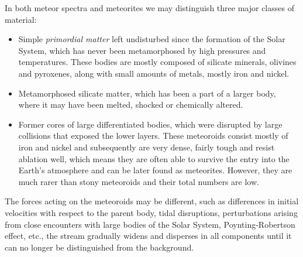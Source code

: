             In both meteor spectra and meteorites we may distinguish three major classes of material:
            \begin{itemize}
                \item Simple \emph{primordial matter} left undisturbed since the formation of the Solar System,
                    which has never been metamorphosed by high pressures and temperatures.
                    These bodies are mostly composed of silicate minerals, olivines and pyroxenes,
                    along with small amounts of metals, mostly iron and nickel.
                \item Metamorphosed silicate matter, which has been a part of a larger body,
                    where it may have been melted, shocked or chemically altered.
                \item Former cores of large differentiated bodies, which were disrupted by large collisions
                    that exposed the lower layers.
                    These meteoroids consist mostly of iron and nickel and subsequently are very dense,
                    fairly tough and resist ablation well, which means they are often able to
                    survive the entry into the Earth's atmosphere and can be later found as meteorites.
                    However, they are much rarer than stony meteoroids and their total numbers are low.
            \end{itemize}

            The forces acting on the meteoroids may be different, such as differences
            in initial velocities with respect to the parent body, tidal disruptions,
            perturbations arising from close encounters with large bodies of the Solar System,
            Poynting-Robertson effect, etc., the stream
            gradually widens and disperses in all components until it can no longer be distinguished from the background.


